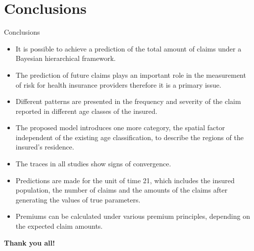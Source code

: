\documentclass[10pt]{beamer} %
\begin{document}
\section{Conclusions}
\begin{frame}{Conclusions}
    \begin{itemize}
        \item It is possible to achieve a prediction of the total amount of claims under a Bayesian hierarchical framework. 
        \item The prediction of future claims plays an important role in the measurement of risk for health insurance providers therefore it is a primary issue. 
        \item Different patterns are presented in the frequency and severity of the claim reported in different age classes of the insured. 
        \item The proposed model introduces one more category, the spatial factor independent of the existing age classification, to describe the regions of the insured's residence. 
     \item The traces in all studies show signs of convergence.
     \item Predictions are made for the unit of time 21, which includes the insured population, the number of claims and the amounts of the claims after generating the values of true parameters.
     \item Premiums can be calculated under various premium principles, depending on the expected claim amounts.
    \end{itemize}
\end{frame}

\begin{frame}
\centering
    \textbf{Thank you all!}
\end{frame}
\end{document}
